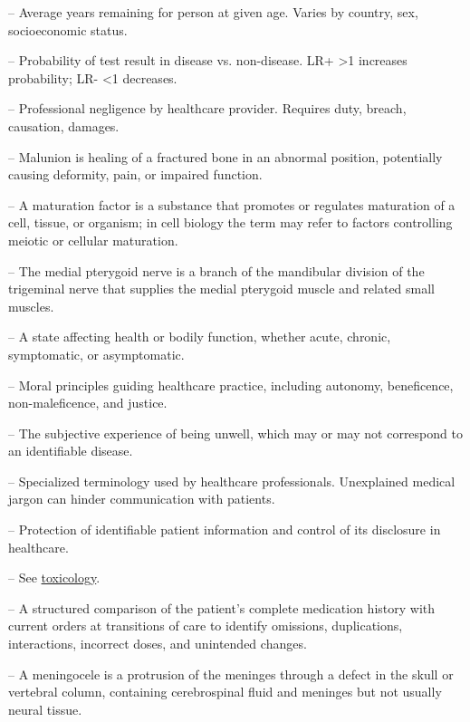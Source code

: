 -- Average years remaining for person at given age. Varies by country, sex, socioeconomic status.

-- Probability of test result in disease vs. non-disease. LR+ >1 increases probability; LR- <1 decreases.

-- Professional negligence by healthcare provider. Requires duty, breach, causation, damages.

-- Malunion is healing of a fractured bone in an abnormal position, potentially causing deformity, pain, or impaired function.

-- A maturation factor is a substance that promotes or regulates maturation of a cell, tissue, or organism; in cell biology the term may refer to factors controlling meiotic or cellular maturation.

-- The medial pterygoid nerve is a branch of the mandibular division of the trigeminal nerve that supplies the medial pterygoid muscle and related small muscles.

-- A state affecting health or bodily function, whether acute, chronic, symptomatic, or asymptomatic.

-- Moral principles guiding healthcare practice, including autonomy, beneficence, non-maleficence, and justice.

-- The subjective experience of being unwell, which may or may not correspond to an identifiable disease.

-- Specialized terminology used by healthcare professionals. Unexplained medical jargon can hinder communication with patients.

-- Protection of identifiable patient information and control of its disclosure in healthcare.

-- See \hyperlink{Toxicology}{toxicology}.

-- A structured comparison of the patient’s complete medication history with current orders at transitions of care to identify omissions, duplications, interactions, incorrect doses, and unintended changes.

-- A meningocele is a protrusion of the meninges through a defect in the skull or vertebral column, containing cerebrospinal fluid and meninges but not usually neural tissue.

